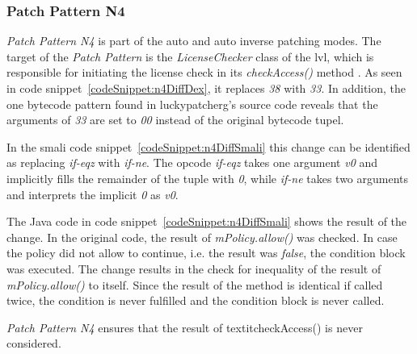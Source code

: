 \subsubsection{Patch Pattern N4}
 \textit{Patch Pattern N4} is part of the auto and auto inverse patching modes.
The target of the \textit{Patch Pattern} is the \textit{LicenseChecker} class of the \gls{lvl}, which is responsible for initiating the license check in its \textit{checkAccess()} method \cite{developersLicensingReference}.
\newline
As seen in code snippet~\ref{codeSnippet:n4DiffDex}, it replaces \textit{38} with \textit{33}.
In addition, the one bytecode pattern found in \gls{luckypatcherg}'s source code reveals that the arguments of \textit{33} are set to \textit{00} instead of the original bytecode tupel.
\newline

In the smali code snippet~\ref{codeSnippet:n4DiffSmali} this change can be identified as replacing \textit{if-eqz} with \textit{if-ne}.
The opcode \textit{if-eqz} takes one argument \textit{v0} and implicitly fills the remainder of the tuple with \textit{0}, while \textit{if-ne} takes two arguments and interprets the implicit \textit{0} as \textit{v0}.
\newline

The Java code in code snippet~\ref{codeSnippet:n4DiffSmali} shows the result of the change.
In the original code, the result of \textit{mPolicy.allow()} was checked.
In case the policy did not allow to continue, i.e. the result was \textit{false}, the condition block was executed.
The change results in the check for inequality of the result of \textit{mPolicy.allow()} to itself.
Since the result of the method is identical if called twice, the condition is never fulfilled and the condition block is never called.
\newline

\textit{Patch Pattern N4} ensures that the result of textit{checkAccess()} is never considered.

